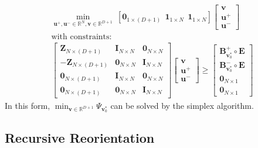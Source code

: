 \documentclass[12pt]{amsart}
\theoremstyle{definition}
\theoremstyle{plain}
\theoremstyle{remark}
\newcommand{\RR}{\mathbb{R}}
\begin{document}
\begin{gather*}
\min_{\mathbf{u}^+, \mathbf{u}^- \in \RR^N, \mathbf{v} \in \RR^{D + 1}}\ [\mathbf{0}_{1 \times (D + 1)} \ \ \mathbf{1}_{1 \times N} \ \ \mathbf{1}_{1 \times N}] \begin{bmatrix} \mathbf{v} \\ \mathbf{u}^+ \\ \mathbf{u}^- \end{bmatrix} \\
\text{with constraints:} \\
\begin{bmatrix} \mathbf{Z}_{N \times (D + 1)} &\mathbf{I}_{N \times N} &\mathbf{0}_{N \times N} \\ -\mathbf{Z}_{N \times (D + 1)} &\mathbf{0}_{N \times N} &\mathbf{I}_{N \times N} \\ \mathbf{0}_{N \times (D + 1)} &\mathbf{I}_{N \times N} &\mathbf{0}_{N \times N} \\ \mathbf{0}_{N \times (D + 1)} &\mathbf{0}_{N \times N} &\mathbf{I}_{N \times N} \end{bmatrix} \begin{bmatrix} \mathbf{v} \\ \mathbf{u}^+ \\ \mathbf{u}^- \end{bmatrix} \geq \begin{bmatrix} \mathbf{B}^+_{\mathbf{v}_0^\ast} \circ \mathbf{E} \\ \mathbf{B}^-_{\mathbf{v}_0^\ast} \circ \mathbf{E} \\ \mathbf{0}_{N \times 1} \\ \mathbf{0}_{N \times 1} \end{bmatrix}
\end{gather*}
In this form, $\min_{\mathbf{v} \in \RR^{D + 1}} \Psi_{\mathbf{v}_0^\ast}$ can be solved by the simplex algorithm. \\


\subsection{Recursive Reorientation} \hfill \\
\end{document}
